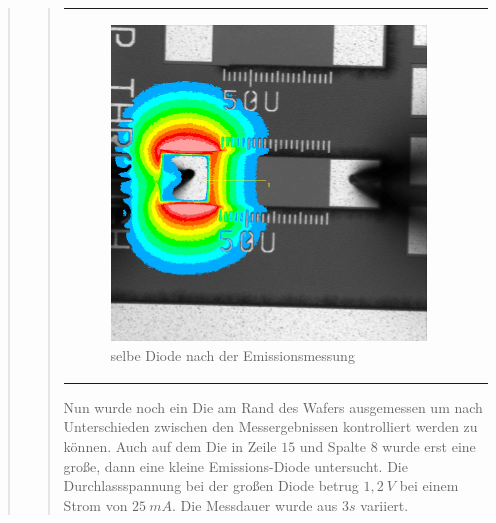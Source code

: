 \begin{quote}
\begin{quote}
\begin{center}
\begin{tabular}{ll}
\begin{minipage}{0.6\textwidth}
                         \begin{figure}[H]
                            \label{fig:}
                            \includegraphics[scale=0.25, trim = 0cm 0cm 0cm
                            0cm,
                            clip]{./Emissionsbilder/zwei/nach_Emissionsmessung_Intensitat_Distanz.jpg}
                            \caption{selbe Diode nach der Emissionsmessung}
                        \end{figure}
                   \vspace{-1.5em}
    
                    \end{minipage}
    
                \end{tabular}
                \end{center}
                
        \vspace{2em}
        
        Nun wurde noch ein Die am Rand des Wafers ausgemessen um nach
        Unterschieden zwischen den Messergebnissen kontrolliert werden zu
        können. Auch auf dem Die in Zeile $15$ und Spalte $8$ wurde erst eine
        große, dann eine kleine Emissions-Diode untersucht. Die Durchlassspannung bei der
        großen Diode betrug $1,2\ V$ bei einem Strom von $25\ mA$. Die Messdauer
        wurde aus $3s$ variiert.
        

\end{quote}
\end{quote}
